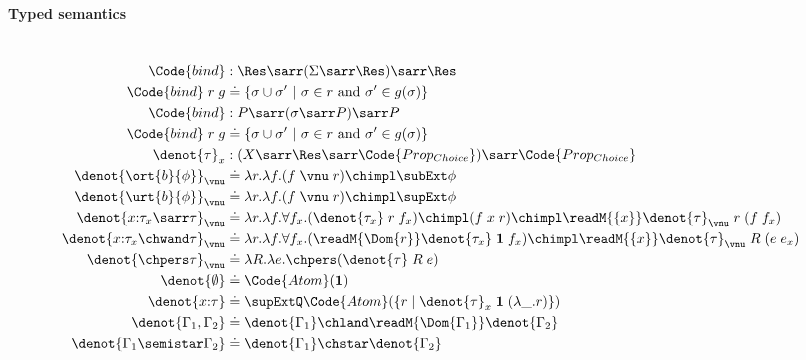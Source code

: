 \paragraph{Typed semantics}
\begin{align*}
  \\\Code{bind} &: \Res \sarr (\Sigma \sarr \Res) \sarr \Res
  \\\Code{bind}\;r\;g &\doteq \{ \sigma \cup \sigma' ~|~ \sigma \in r \text{ and } \sigma' \in g(\sigma) \}
  \\\Code{bind} &: P \sarr (\sigma \sarr P) \sarr P
  \\\Code{bind}\;r\;g &\doteq \{ \sigma \cup \sigma' ~|~ \sigma \in r \text{ and } \sigma' \in g(\sigma) \}
  \\\denot{\tau}_x &: (X \sarr \Res \sarr \Code{Prop_{Choice}}) \sarr \Code{Prop_{Choice}}
  \\\denot{\ort{b}{\phi}}_\vnu &\doteq \lambda r.\lambda f. (f\;\vnu\;r) \chimpl \subExt \phi
  \\\denot{\urt{b}{\phi}}_\vnu &\doteq \lambda r.\lambda f. (f\;\vnu\;r) \chimpl \supExt \phi
  \\\denot{x{:}\tau_x \sarr \tau}_\vnu &\doteq \lambda r.\lambda f.\forall f_x. (\denot{\tau_x}\;r\;f_x) \chimpl (f\;x\;r) \chimpl \readM{\{x\}} \denot{\tau}_\vnu\;r\;(f\;f_x)
  \\\denot{x{:}\tau_x \chwand \tau}_\vnu &\doteq \lambda r.\lambda f.\forall f_x. (\readM{\Dom{r}} \denot{\tau_x}\;\textbf{1}\;f_x) \chimpl \readM{\{x\}} \denot{\tau}_\vnu\;R\;(e\;e_x)
  \\\denot{\chpers \tau}_\vnu &\doteq \lambda R. \lambda e. \chpers (\denot{\tau}\;R\;e)
  \\\denot{\emptyset} &\doteq \Code{Atom}(\textbf{1})
  \\\denot{x{:}\tau} &\doteq \supExtQ \Code{Atom}(\{r \mid \denot{\tau}_x\;\textbf{1}\;(\lambda\_.r) \})
  \\\denot{\Gamma_1, \Gamma_2} &\doteq \denot{\Gamma_1} \chland \readM{\Dom{\Gamma_1}} \denot{\Gamma_2}
  \\\denot{\Gamma_1 \semistar \Gamma_2} &\doteq \denot{\Gamma_1} \chstar \denot{\Gamma_2}

\end{align*}
